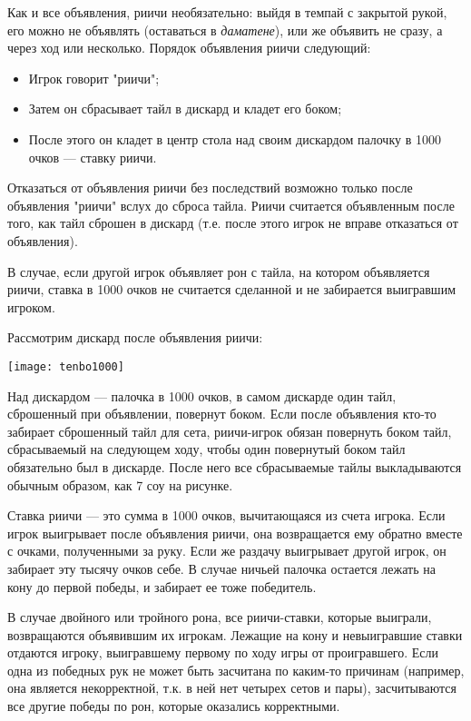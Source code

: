 Как и все объявления, риичи необязательно: выйдя в темпай с закрытой рукой, его можно не объявлять (оставаться в \textit{даматене}), или же объявить не сразу, а через ход или несколько. Порядок объявления риичи следующий:

\begin{itemize}
	\item Игрок говорит "риичи";
	\item Затем он сбрасывает тайл в дискард и кладет его боком;
	\item После этого он кладет в центр стола над своим дискардом палочку в 1000 очков --- ставку риичи.
\end{itemize}

Отказаться от объявления риичи без последствий возможно только после объявления "риичи" вслух до сброса тайла. Риичи считается объявленным после того, как тайл сброшен в дискард (т.е. после этого игрок не вправе отказаться от объявления). 

В случае, если другой игрок объявляет рон с тайла, на котором объявляется риичи, ставка в 1000 очков не считается сделанной и не забирается выигравшим игроком.

Рассмотрим дискард после объявления риичи:

\hspace{1.3cm} \texttt{[image: tenbo1000]}



Над дискардом --- палочка в 1000 очков, в самом дискарде один тайл, сброшенный при объявлении, повернут боком. Если после объявления кто-то забирает сброшенный тайл для сета, риичи-игрок обязан повернуть боком тайл, сбрасываемый на следующем ходу, чтобы один повернутый боком тайл обязательно был в дискарде. После него все сбрасываемые тайлы выкладываются обычным образом, как 7 соу на рисунке.

Ставка риичи --- это сумма в 1000 очков, вычитающаяся из счета игрока. Если игрок выигрывает после объявления риичи, она возвращается ему обратно вместе с очками, полученными за руку. Если же раздачу выигрывает другой игрок, он забирает эту тысячу очков себе. В случае ничьей палочка остается лежать на кону до первой победы, и забирает ее тоже победитель.

В случае двойного или тройного рона, все риичи-ставки, которые выиграли, возвращаются объявившим их игрокам. Лежащие на кону и невыигравшие ставки отдаются игроку, выигравшему первому по ходу игры от проигравшего. Если одна из победных рук не может быть засчитана по каким-то причинам (например, она является некорректной, т.к. в ней нет четырех сетов и пары), засчитываются все другие победы по рон, которые оказались корректными.

